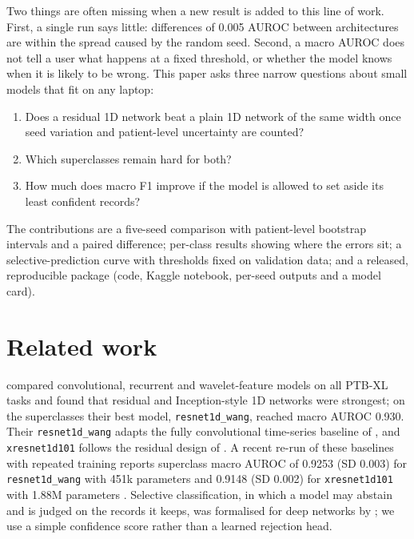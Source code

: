\documentclass[11pt,a4paper]{article}
\newcommand{\code}[1]{\texttt{#1}}
\begin{document}
Two things are often missing when a new result is added to this line of work. First, a single run says little:
differences of 0.005 AUROC between architectures are within the spread caused by the random seed. Second, a
macro AUROC does not tell a user what happens at a fixed threshold, or whether the model knows when it is likely
to be wrong. This paper asks three narrow questions about small models that fit on any laptop:

\begin{enumerate}
\item Does a residual 1D network beat a plain 1D network of the same width once seed variation and
patient-level uncertainty are counted?
\item Which superclasses remain hard for both?
\item How much does macro F1 improve if the model is allowed to set aside its least confident records?
\end{enumerate}

\noindent The contributions are a five-seed comparison with patient-level bootstrap intervals and a paired
difference; per-class results showing where the errors sit; a selective-prediction curve with thresholds fixed on
validation data; and a released, reproducible package (code, Kaggle notebook, per-seed outputs and a model card).

\section{Related work}

\citet{strodthoff2021benchmarks} compared convolutional, recurrent and wavelet-feature models on all PTB-XL tasks
and found that residual and Inception-style 1D networks were strongest; on the superclasses their best model,
\code{resnet1d\_wang}, reached macro AUROC 0.930. Their \code{resnet1d\_wang} adapts the
fully convolutional time-series baseline of \citet{wang2017tsc}, and \code{xresnet1d101} follows the residual design
of \citet{he2016resnet}. A recent re-run of these baselines with repeated training reports superclass macro AUROC
of 0.9253 (SD 0.003) for \code{resnet1d\_wang} with 451k parameters and 0.9148 (SD 0.002) for
\code{xresnet1d101} with 1.88M parameters \citep{abreu2025code2}. Selective classification, in which a model may
abstain and is judged on the records it keeps, was formalised for deep networks by
\citet{geifman2017selective}; we use a simple confidence score rather than a learned rejection head.
\end{document}

